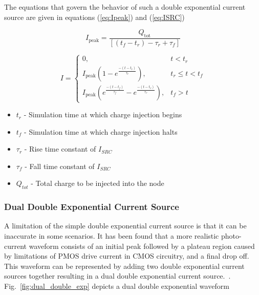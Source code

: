 \documentclass[conference]{IEEEtran}
\begin{document}
    The equations that govern the behavior of such a double exponential current source are given in equations (\ref{eq:Ipeak}) and (\ref{eq:ISRC})
    
    \begin{equation}
        I_{\text{peak}} = \frac{Q_{\text{tot}}}{[(t_f - t_r) - \tau_r + \tau_f]}\label{eq:Ipeak}
    \end{equation}

    \begin{equation}
        I = \begin{cases}
                      0, & t < t_r \\
                      I_{\text{peak}}\left(1 - e^{\frac{-(t - t_r)}{\tau_r}}\right), & t_r \leq t < t_f \\
                      I_{\text{peak}}\left(e^{\frac{-(t - t_f)}{\tau_f}} - e^{\frac{-(t - t_r)}{\tau_r}}\right), & t_f > t
        \end{cases}\label{eq:ISRC}
    \end{equation}
    
	\vspace{1em}
    
    \begin{itemize}
        \item[] \(t_r\) - Simulation time at which charge injection begins

        \item[] \(t_f\) - Simulation time at which charge injection halts

        \item[] \(\tau_r\) - Rise time constant of \(I_{SRC}\)

        \item[] \(\tau_f\) - Fall time constant of \(I_{SRC}\)

        \item[] \(Q_{tot}\) - Total charge to be injected into the node
    \end{itemize}
    
    \vspace{1em}

    \subsubsection{Dual Double Exponential Current Source}
    A limitation of the simple double exponential current source is that it can be inaccurate in some scenarios.
    It has been found that a more realistic photo-current waveform consists of an initial peak followed by a plateau region caused by limitations of PMOS drive current in CMOS circuitry, and a final drop off.
    This waveform can be represented by adding two double exponential current sources together resulting in a dual double exponential current source.~\cite{Black2015}.
    Fig.~\ref{fig:dual_double_exp} depicts a dual double exponential waveform
\end{document}
